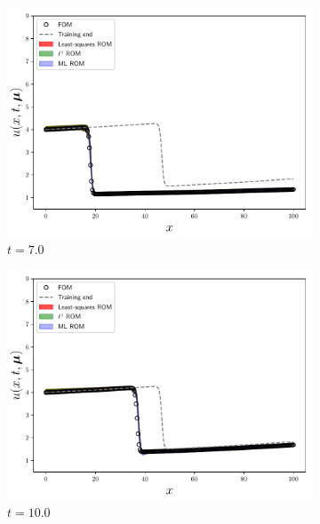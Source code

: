 \documentclass[3p,computermodern,10pt]{elsarticle}
\begin{document}
\begin{figure}
\begin{center}
\begin{subfigure}[t]{0.24\textwidth}
\includegraphics[trim={0cm 0cm 0cm 0cm},clip,width=1.0\linewidth]{code/burgers/synapse_models/elu/results/usolExtrapolate_0001.pdf} 
\caption{$t=7.0$}
\end{subfigure}
\begin{subfigure}[t]{0.24\textwidth}
\includegraphics[trim={0cm 0cm 0cm 0cm},clip,width=1.0\linewidth]{code/burgers/synapse_models/elu/results/usolExtrapolate_0003.pdf} 
\caption{$t=10.0$}
\end{subfigure}
\begin{subfigure}[t]{0.24\textwidth}

\end{subfigure}
\end{center}
\end{figure}
\end{document}
